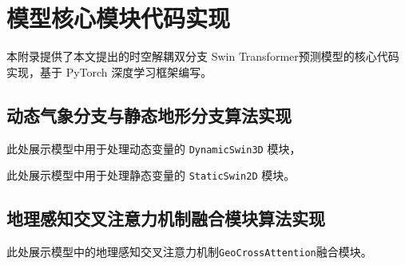 
\chapter{模型核心模块代码实现}
\label{appendix:A}

本附录提供了本文提出的时空解耦双分支 Swin Transformer预测模型的核心代码实现，基于 PyTorch 深度学习框架编写。

\section{动态气象分支与静态地形分支算法实现}
\label{app:A-1}
此处展示模型中用于处理动态变量的 \texttt{DynamicSwin3D} 模块，


此处展示模型中用于处理静态变量的 \texttt{StaticSwin2D} 模块。


\section{地理感知交叉注意力机制融合模块算法实现}
\label{app:A-2}
此处展示模型中的地理感知交叉注意力机制\texttt{GeoCrossAttention}融合模块。



